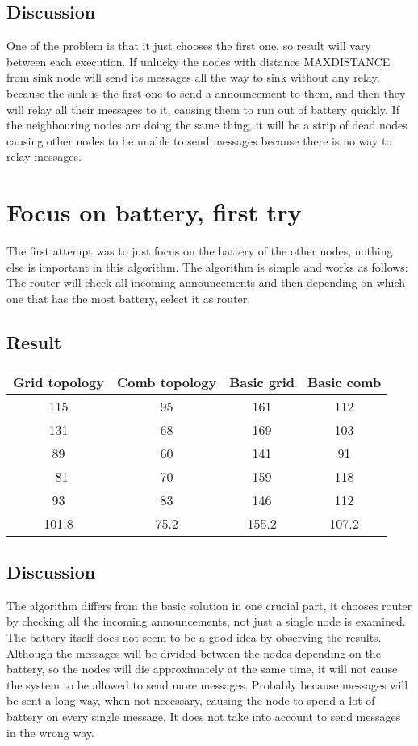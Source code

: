 \documentclass{article}
\begin{document}
  \subsection{Discussion}
   One of the problem is that it just chooses the first one,
   so result will vary between each execution.
   If unlucky the nodes with distance MAXDISTANCE from
   sink node will send its messages all the way to sink
   without any relay, because the sink is the first one
   to send a announcement to them, and then they will relay
   all their messages to it, causing them to run out of
   battery quickly. If the neighbouring nodes
   are doing the same thing, it will be a strip of dead
   nodes causing other nodes to be unable to send messages
   because there is no way to relay messages. 

\section{Focus on battery, first try}
  The first attempt was to just focus on the battery of the other nodes, 
  nothing else is important in this algorithm. The algorithm is simple
  and works as follows: The router will check all incoming announcements
  and then depending on which one that has the most battery, select it as
  router.  
  \subsection{Result}
    \begin{tabular}{c|c||c|c}
      Grid topology & Comb topology & Basic grid & Basic comb\\
      \hline
      \hline
      115 & 95 & 161 & 112\\
      131 & 68 & 169 & 103\\
      89  & 60 & 141 & 91\\\
      81  & 70 & 159 & 118\\
      93  & 83 & 146 & 112\\
      \hline
      101.8&75.2&155.2&107.2\\

      
    \end{tabular}
  \subsection{Discussion}
    The algorithm differs from the basic solution in one crucial part, it chooses
    router by checking all the incoming announcements, not just a single node is examined.
    The battery itself does not seem to be a good idea by observing the results.
    Although the messages will be divided between the nodes depending on the battery,
    so the nodes will die approximately at the same time, it will not cause the
    system to be allowed to send more messages. Probably because messages will be sent
    a long way, when not necessary, causing the node to spend a lot of battery on
    every single message.
    It does not take into account to send messages in the wrong way.
\end{document}
